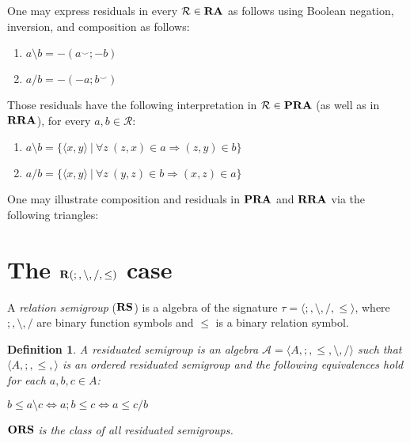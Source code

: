 \documentclass[a4paper]{article}
\theoremstyle{defin}
\newtheorem{defin}{Definition}
\theoremstyle{theorem}
\theoremstyle{prop}
\theoremstyle{lemma}
\theoremstyle{ex}
\theoremstyle{col}
\theoremstyle{claim}
\begin{document}
One may express residuals in every $\mathcal{R} \in {\bf RA}$ as follows using Boolean negation, inversion, and composition as follows:

\begin{enumerate}
  \item $a \setminus b = -(a^{\smile} ; -b)$
  \item $a / b = - (- a ; b^{\smile})$
\end{enumerate}

Those residuals have the following interpretation in $\mathcal{R} \in {\bf PRA}$ (as well as in ${\bf RRA}$), for every $a, b \in \mathcal{R}$:
\begin{enumerate}
  \item $a \setminus b = \{ \langle x, y \rangle \: | \: \forall z \: (z, x) \in a \Rightarrow (z, y) \in b \}$
  \item $a / b = \{ \langle x, y \rangle \: | \: \forall z \: (y, z) \in b \Rightarrow (x, z) \in a \}$
\end{enumerate}
One may illustrate composition and residuals in ${\bf PRA}$ and ${\bf RRA}$ via the following triangles:


\section{The ${\bf R}(;, \setminus, /, \leq)$ case}

 A \emph{relation semigroup} (${\bf RS}$) is a algebra of the signature $\tau = \langle ;, \setminus, /, \leq \rangle$, where $;, \setminus, /$ are binary function symbols and $\leq$ is a binary relation symbol.

\begin{defin}
  A residuated semigroup is an algebra $\mathcal{A} = \langle A, ;, \leq, \setminus, / \rangle$ such that $\langle A, ;, \leq, \rangle$ is
  an ordered residuated semigroup and the following equivalences hold for each $a, b, c \in A$:

  \begin{center}
    $b \leq a \setminus c \Leftrightarrow a ; b \leq c \Leftrightarrow a \leq c / b$
  \end{center}
  ${\bf ORS}$ is the class of all residuated semigroups.
\end{defin}
\end{document}
